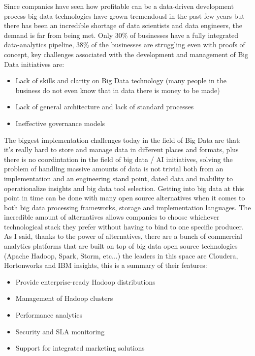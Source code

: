 Since companies have seen how profitable can be a data-driven development process big data technologies have grown tremendousl in the past few years but there has been an incredible shortage of data scientists and data engineers, the demand is far from being met. \n
Only 30\% of businesses have a fully integrated data-analytics pipeline, 38\% of the businesses are struggling even with proofs of concept, key challenges associated with the development and management of Big Data initiatives are:
\begin{itemize}
    \item Lack of skills and clarity on Big Data technology (many people in the business do not even know that in data there is money to be made)
    \item Lack of general architecture and lack of standard processes
    \item Ineffective governance models
\end{itemize}
The biggest implementation challenges today in the field of Big Data are that: it's really hard to store and manage data in different places and formats, plus there is no coordintation in the field of big data / AI initiatives, solving the problem of handling massive amounts of data is not trivial both from an implementation and an engineering stand point, dated data and inability to operationalize insights and big data tool selection. \n
Getting into big data at this point in time can be done with many open source alternatives when it comes to both big data processing frameworks, storage and implementation languages. The incredible amount of alternatives allows companies to choose whichever technological stack they prefer without having to bind to one specific producer. \n
As I said, thanks to the power of alternatives, there are a bunch of commercial analytics platforms that are built on top of big data open source technologies (Apache Hadoop, Spark, Storm, etc...) the leaders in this space are Cloudera, Hortonworks and IBM insights, this is a summary of their features:
\begin{itemize}
    \item Provide enterprise-ready Hadoop distributions
    \item Management of Hadoop clusters
    \item Performance analytics
    \item Security and SLA monitoring
    \item Support for integrated marketing solutions
\end{itemize}
